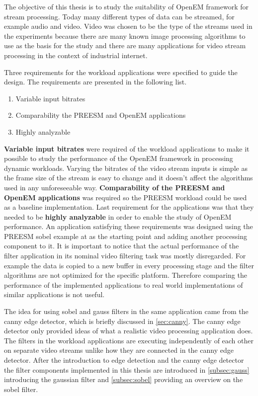 The objective of this thesis is to study the suitability of OpenEM framework for stream processing. Today many different types of data can be streamed, for example audio and video. Video was chosen to be the type of the streams used in the experiments because there are many known image processing algorithms to use as the basis for the study and there are many applications for video stream processing in the context of industrial internet. 

Three requirements for the workload applications were specified to guide the design. The requirements are presented in the following list.

\begin{enumerate}
    \item{Variable input bitrates}
    \item{Comparability the PREESM and OpenEM applications}
    \item{Highly analyzable}
\end{enumerate}

\textbf{Variable input bitrates} were required of the workload applications to make it possible to study the performance of the OpenEM framework in processing dynamic workloads. Varying the bitrates of the video stream inputs is simple as the frame size of the stream is easy to change and it doesn't affect the algorithms used in any unforeseeable way. \textbf{Comparability of the PREESM and OpenEM applications} was required so the PREESM workload could be used as a baseline implementation. Last requirement for the applications was that they needed to be \textbf{highly analyzable} in order to enable the study of OpenEM performance. An application satisfying these requirements was designed using the PREESM sobel example at \cite{preesmtut} as the starting point and adding another processing component to it. It is important to notice that the actual performance of the filter application in its nominal video filtering task was mostly disregarded. For example the data is copied to a new buffer in every processing stage and the filter algorithms are not optimized for the specific platform. Therefore comparing the performance of the implemented applications to real world implementations of similar applications is not useful.

The idea for using sobel and gauss filters in the same application came from the canny edge detector, which is briefly discussed in \ref{sec:canny}. The canny edge detector only provided ideas of what a realistic video processing application does. The filters in the workload applications are executing independently of each other on separate video streams unlike how they are connected in the canny edge detector. After the introduction to edge detection and the canny edge detector the filter components implemented in this thesis are introduced in \ref{subsec:gauss} introducing the gaussian filter and \ref{subsec:sobel} providing an overview on the sobel filter.\\
